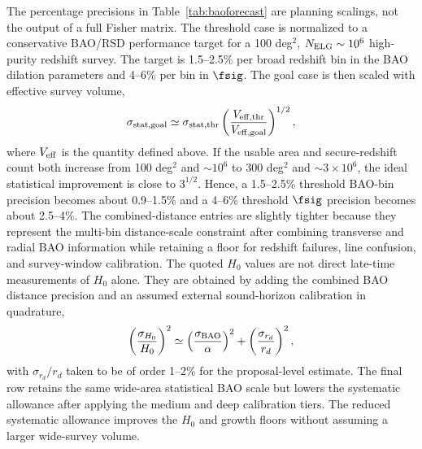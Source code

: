 The percentage precisions in Table~\ref{tab:baoforecast} are planning scalings, not the output of a full Fisher matrix. The threshold case is normalized to a conservative BAO/RSD performance target for a 100 deg$^2$, $N_{\rm ELG}\sim10^6$ high-purity redshift survey. The target is 1.5--2.5\% per broad redshift bin in the BAO dilation parameters and 4--6\% per bin in $\fsig$. The goal case is then scaled with effective survey volume,
\begin{equation}
  \sigma_{\rm stat,goal}\simeq
  \sigma_{\rm stat,thr}
  \left(\frac{V_{\rm eff,thr}}{V_{\rm eff,goal}}\right)^{1/2},
\end{equation}
where $V_{\rm eff}$ is the quantity defined above. If the usable area and secure-redshift count both increase from 100 deg$^2$ and $\sim10^6$ to 300 deg$^2$ and $\sim3\times10^6$, the ideal statistical improvement is close to $3^{1/2}$. Hence, a 1.5--2.5\% threshold BAO-bin precision becomes about 0.9--1.5\% and a 4--6\% threshold $\fsig$ precision becomes about 2.5--4\%. The combined-distance entries are slightly tighter because they represent the multi-bin distance-scale constraint after combining transverse and radial BAO information while retaining a floor for redshift failures, line confusion, and survey-window calibration. The quoted $H_0$ values are not direct late-time measurements of $H_0$ alone. They are obtained by adding the combined BAO distance precision and an assumed external sound-horizon calibration in quadrature,
\begin{equation}
  \left(\frac{\sigma_{H_0}}{H_0}\right)^2
  \simeq
  \left(\frac{\sigma_{\rm BAO}}{\alpha}\right)^2+
  \left(\frac{\sigma_{r_d}}{r_d}\right)^2 ,
\end{equation}
with $\sigma_{r_d}/r_d$ taken to be of order 1--2\% for the proposal-level estimate. The final row retains the same wide-area statistical BAO scale but lowers the systematic allowance after applying the medium and deep calibration tiers. The reduced systematic allowance improves the $H_0$ and growth floors without assuming a larger wide-survey volume.

